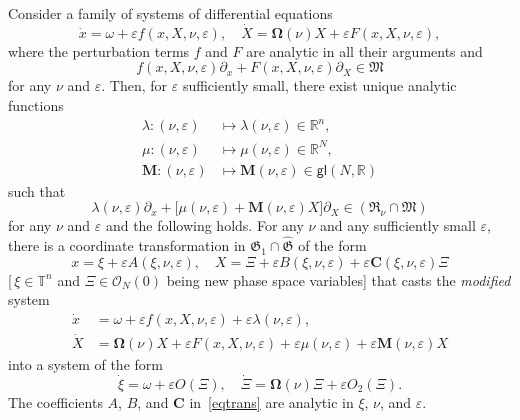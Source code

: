 \documentclass[12pt,reqno]{amsart}
\theoremstyle{definition}
\begin{document}
\begin{thm}\label{thmain}
Consider a family of systems of differential equations
\[
\dot{x}=\omega+{\varepsilon} f(x,X,\nu,{\varepsilon}), \quad
\dot{X}={\mathbf{\Omega}}(\nu)X+{\varepsilon} F(x,X,\nu,{\varepsilon}),
\]
where the perturbation terms $f$ and $F$ are analytic in all their arguments
and
\[
f(x,X,\nu,{\varepsilon})\partial_x+F(x,X,\nu,{\varepsilon})\partial_X \in {\mathfrak M}
\]
for any $\nu$ and ${\varepsilon}$. Then, for ${\varepsilon}$ sufficiently small, there exist
unique analytic functions
\begin{equation}
\begin{aligned}
\lambda:(\nu,{\varepsilon}) &\mapsto \lambda(\nu,{\varepsilon})\in{\mathbb R}^n, \\
\mu:(\nu,{\varepsilon}) &\mapsto \mu(\nu,{\varepsilon})\in{\mathbb R}^N, \\
{\mathbf M}:(\nu,{\varepsilon}) &\mapsto {\mathbf M}(\nu,{\varepsilon})\in{\mathsf{gl}}(N,{\mathbb R})
\end{aligned}
\label{eqmod}
\end{equation}
such that
\begin{equation}
\lambda(\nu,{\varepsilon})\partial_x +
\bigl[\mu(\nu,{\varepsilon})+{\mathbf M}(\nu,{\varepsilon})X\bigr]\partial_X \in ({\mathfrak R}_\nu\cap{\mathfrak M})
\label{eqlmbM}
\end{equation}
for any $\nu$ and ${\varepsilon}$ and the following holds. For any $\nu$ and any
sufficiently small ${\varepsilon}$, there is a coordinate transformation in
${\mathfrak G}_1\cap{\widehat{\mathfrak G}}$ of the form
\begin{equation}
x=\xi+{\varepsilon} A(\xi,\nu,{\varepsilon}), \quad
X=\Xi+{\varepsilon} B(\xi,\nu,{\varepsilon})+{\varepsilon}{\mathbf C}(\xi,\nu,{\varepsilon})\Xi
\label{eqtrans}
\end{equation}
\textup{[}\,$\xi\in{\mathbb T}^n$ and $\Xi\in{\mathcal O}_N(0)$ being new phase space
variables\/\textup{]} that casts the \emph{modified} system
\begin{equation}
\begin{aligned}
\dot{x} &= \omega+{\varepsilon} f(x,X,\nu,{\varepsilon}) + {\varepsilon}\lambda(\nu,{\varepsilon}), \\
\dot{X} &= {\mathbf{\Omega}}(\nu)X+{\varepsilon} F(x,X,\nu,{\varepsilon}) +
{\varepsilon}\mu(\nu,{\varepsilon})+{\varepsilon}{\mathbf M}(\nu,{\varepsilon})X
\end{aligned}
\label{eqnews}
\end{equation}
into a system of the form
\begin{equation}
\dot{\xi}=\omega+{\varepsilon} O(\Xi), \quad
\dot{\Xi}={\mathbf{\Omega}}(\nu)\Xi+{\varepsilon} O_2(\Xi).
\label{eqclear}
\end{equation}
The coefficients $A$, $B$, and ${\mathbf C}$ in~\eqref{eqtrans} are analytic in $\xi$,
$\nu$, and ${\varepsilon}$.
\end{thm}
\end{document}
